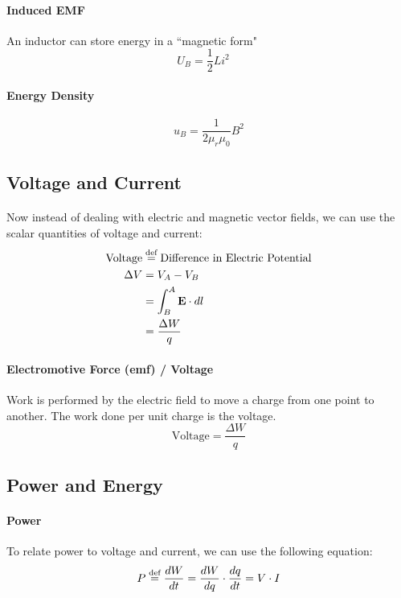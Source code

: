 \documentclass[11pt]{article}
\begin{document}
\paragraph{Induced EMF} An inductor can store energy in a ``magnetic form"
\begin{equation}
    U_B = \frac{1}{2} L i^2 \quad 
\end{equation}
\paragraph{Energy Density}
\begin{equation}
    u_B = \frac{1}{2 \mu_r \mu_0} B^2
\end{equation}
\subsection{Voltage and Current}
\paragraph{} Now instead of dealing with electric and magnetic vector fields, we can
use the scalar quantities of voltage and current:
\begin{align}
    \text{Voltage} &\stackrel{\text{def}}{=} \text{Difference in Electric Potential}\nonumber \\ 
    \Delta V &= V_A - V_B \nonumber \\
    &= \int_B^A \textbf{E} \cdot dl \nonumber\\
    &= \frac{\Delta W}{q}
\end{align}

\paragraph{Electromotive Force (emf) / Voltage} Work is performed by 
the electric field to move a charge from one point to another. 
The work done per unit charge is the voltage.
\begin{equation}
    \text{Voltage} = \frac{\Delta W}{q}
\end{equation}
\subsection{Power and Energy}
\paragraph{Power} To relate power to  voltage and current, we can use the following equation:
\begin{equation}
    P \stackrel{\text{def}}{=} \frac{dW}{dt} = \frac{dW}{dq} \cdot \frac{dq}{dt} = V \cdot I
\end{equation}
\end{document}
